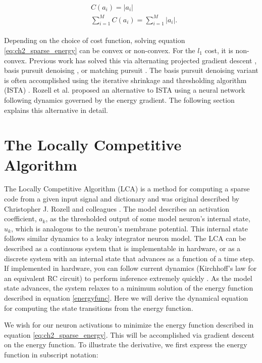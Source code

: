 \begin{align}\label{eq:ch2_l1_cost}
\begin{split}
  &C(a_{i}) = |a_{i}| \\
  &\sum\limits_{i=1}^{M}C(a_{i}) = \sum\limits_{i=1}^{M}|a_{i}|.
\end{split}
\end{align}

Depending on the choice of cost function, solving equation \eqref{eq:ch2_sparse_energy} can be convex or non-convex. For the $l_{1}$ cost, it is non-convex. Previous work has solved this via alternating projected gradient descent \parencite{olshausen1997sparse}, basis pursuit denoising \parencite{chen2001atomic}, or matching pursuit \parencite{davis1997adaptive, rehn2007network, rebollo2002optimized}. The basis pursuit denoising variant is often accomplished using the iterative shrinkage and thresholding algorithm (ISTA) \parencite{daubechies2004iterative, beck2009fast}. Rozell et al. \citeyearpar{rozell2008sparse} proposed an alternative to ISTA using a neural network following dynamics governed by the energy gradient. The following section explains this alternative in detail.


\section{The Locally Competitive Algorithm}
The Locally Competitive Algorithm (LCA) is a method for computing a sparse code from a given input signal and dictionary and was original described by Christopher J. Rozell and colleagues \citeyearpar{rozell2008sparse}. The model describes an activation coefficient, $a_{k}$, as the thresholded output of some model neuron's internal state, $u_{k}$, which is analogous to the neuron's membrane potential. This internal state follows similar dynamics to a leaky integrator neuron model. The LCA can be described as a continuous system that is implementable in hardware, or as a discrete system with an internal state that advances as a function of a time step. If implemented in hardware, you can follow current dynamics (Kirchhoff's law for an equivalent RC circuit) to perform inference extremely quickly \parencite{rozell2008sparse}. As the model state advances, the system relaxes to a minimum solution of the energy function described in equation \eqref{energyfunc}. Here we will derive the dynamical equation for computing the state transitions from the energy function.

We wish for our neuron activations to minimize the energy function described in equation \eqref{eq:ch2_sparse_energy}. This will be accomplished via gradient descent on the energy function. To illustrate the derivative, we first express the energy function in subscript notation:

